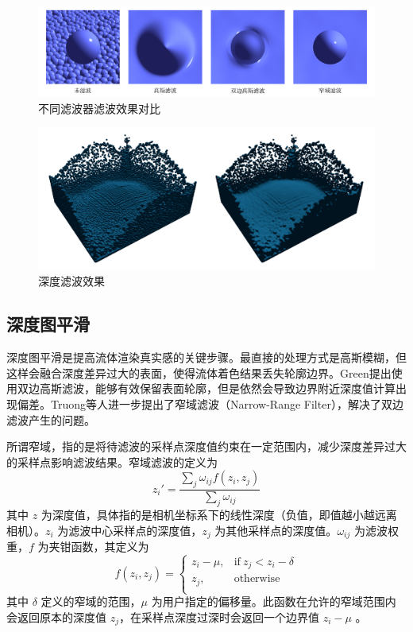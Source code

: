     \begin{figure}
    	\centering
    	\includegraphics[width=.99\textwidth]{figures/rendering/filters.png}
    	\caption{不同滤波器滤波效果对比\cite{TY18NRSSF}}
    \end{figure}
    
    \begin{figure}
    	\centering
    	\includegraphics[width=.75\textwidth]{figures/rendering/before_after_filter.png}
    	\caption{深度滤波效果}
    \end{figure}

\subsection{深度图平滑}
    深度图平滑是提高流体渲染真实感的关键步骤。最直接的处理方式是高斯模糊，但这样会融合深度差异过大的表面，使得流体着色结果丢失轮廓边界。Green\cite{G10SSF}提出使用双边高斯滤波，能够有效保留表面轮廓，但是依然会导致边界附近深度值计算出现偏差。Truong等人\cite{TY18NRSSF}进一步提出了窄域滤波（Narrow-Range Filter），解决了双边滤波产生的问题。
    
    所谓窄域，指的是将待滤波的采样点深度值约束在一定范围内，减少深度差异过大的采样点影响滤波结果。窄域滤波的定义为
    \begin{equation}
    	z_i' = \frac {\sum_j \omega_{ij} f(z_i, z_j)}{\sum_j \omega_{ij}}
    \end{equation}
    其中 $z$ 为深度值，具体指的是相机坐标系下的线性深度（负值，即值越小越远离相机）。$z_i$ 为滤波中心采样点的深度值，$z_j$ 为其他采样点的深度值。$\omega_{ij}$ 为滤波权重，$f$ 为夹钳函数，其定义为
    \begin{equation}
    	f(z_i, z_j) = 
    	\left\{
    	\begin{array}{ll}
    	z_i - \mu, 	& \mathrm{if} \ z_j < z_i - \delta \\
    	z_j,   		& \mathrm{otherwise} \\
    	\end{array}
    	\right.
    \end{equation}
    其中 $\delta$ 定义的窄域的范围，$\mu$ 为用户指定的偏移量。此函数在允许的窄域范围内会返回原本的深度值 $z_j$，在采样点深度过深时会返回一个边界值 $z_i-\mu$ 。
    
